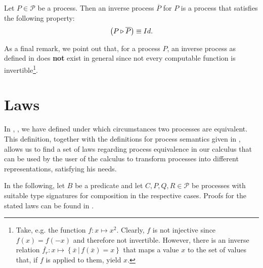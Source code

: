 \begin{definition}
\label{def:inverse_process}
Let $P \in \mathcal{P}$ be a process. Then an inverse process $\overline{P}$ for $P$ is a process that satisfies the following property:
  \begin{equation*}
    \left( P \triangleright \overline{P} \right) \equiv Id.
  \end{equation*}
  \hfill\qedsymbol
\end{definition}


As a final remark, we point out that, for a process $P$, an inverse process as defined in  does \textbf{not} exist in general since not every computable function is invertible\footnote{Take, e.g. the function $f \colon x \mapsto x^2$. Clearly, $f$ is not injective since $f \left( x \right) = f \left( -x \right)$ and therefore not invertible. However, there is an inverse relation $\overline{f_r} \colon x \mapsto \left\{ \overline{x} \,|\, f \left( \overline{x} \right) = x \right\}$ that maps a value $x$ to the set of values that, if $f$ is applied to them, yield $x$.}.



\clearpage
\section{Laws}
\label{chp:laws}
\vspace*{-0.75em}
In , , we have defined under which circumstances two processes are equivalent. This definition, together with the definitions for process semantics given in , allows us to find a set of laws regarding process equivalence in our calculus that can be used by the user of the calculus to transform processes into different representations, satisfying his needs.

In the following, let $B$ be a predicate and let $C, P, Q, R \in \mathcal{P}$ be processes with suitable type signatures for composition in the respective cases. Proofs for the stated laws can be found in .

